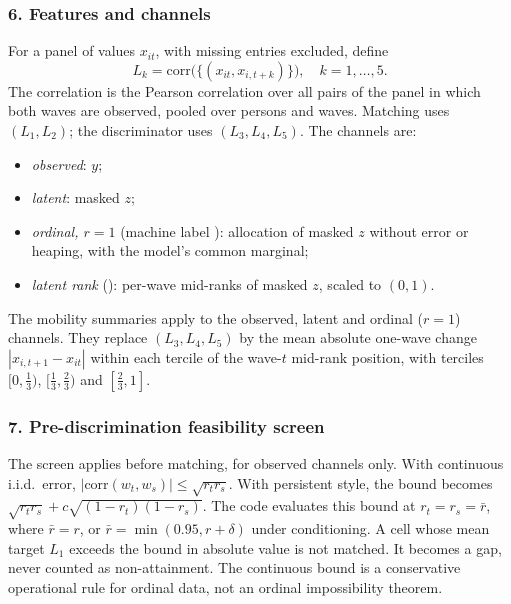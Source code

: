 \subsubsection*{6. Features and channels}
For a panel of values $x_{it}$, with missing entries excluded, define
\begin{equation*}
L_k=\mathrm{corr}\bigl(\{(x_{it},x_{i,t+k})\}\bigr),\quad k=1,\ldots,5.
\end{equation*}
The correlation is the Pearson correlation over all pairs of the panel in which both waves are observed, pooled over persons and waves. Matching uses $(L_1,L_2)$; the discriminator uses $(L_3,L_4,L_5)$. The channels are:
\begin{itemize}
\item \emph{observed}: $y$;
\item \emph{latent}: masked $z$;
\item \emph{ordinal, $r=1$} (machine label ): allocation of masked $z$ without error or heaping, with the model's common marginal;
\item \emph{latent rank} (): per-wave mid-ranks of masked $z$, scaled to $(0,1)$.
\end{itemize}
The mobility summaries apply to the observed, latent and ordinal ($r=1$) channels. They replace $(L_3,L_4,L_5)$ by the mean absolute one-wave change $|x_{i,t+1}-x_{it}|$ within each tercile of the wave-$t$ mid-rank position, with terciles $[0,\tfrac13)$, $[\tfrac13,\tfrac23)$ and $[\tfrac23,1]$.

\subsubsection*{7. Pre-discrimination feasibility screen}
The screen applies before matching, for observed channels only. With continuous i.i.d.\ error, $|\mathrm{corr}(w_t,w_s)|\le\sqrt{r_tr_s}$. With persistent style, the bound becomes $\sqrt{r_tr_s}+c\sqrt{(1-r_t)(1-r_s)}$. The code evaluates this bound at $r_t=r_s=\bar r$, where $\bar r=r$, or $\bar r=\min(0.95,r+\delta)$ under conditioning. A cell whose mean target $L_1$ exceeds the bound in absolute value is not matched. It becomes a gap, never counted as non-attainment. The continuous bound is a conservative operational rule for ordinal data, not an ordinal impossibility theorem.

